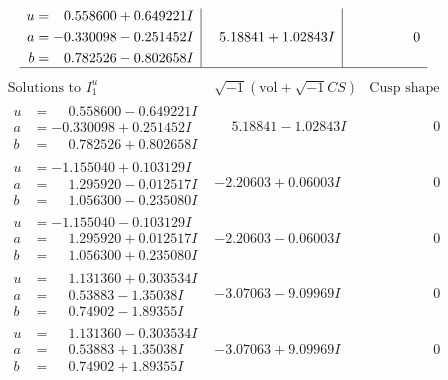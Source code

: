 \documentclass[1p]{elsarticle_modified}
\theoremstyle{definition}
\newcommand{\I}{\sqrt{-1}}
\begin{document}
$$\begin{array}{c|c|c}
\begin{aligned}
u &= \phantom{-}0.558600 + 0.649221 I \\
a &= -0.330098 - 0.251452 I \\
b &= \phantom{-}0.782526 - 0.802658 I\end{aligned}
 & \phantom{-}5.18841 + 1.02843 I & \phantom{-0.000000 } 0\\
 \hline 
 \end{array}$$\newpage$$\begin{array}{c|c|c}  
\text{Solutions to }I^u_{1}& \I (\text{vol} + \sqrt{-1}CS) & \text{Cusp shape}\\
 \hline 
\begin{aligned}
u &= \phantom{-}0.558600 - 0.649221 I \\
a &= -0.330098 + 0.251452 I \\
b &= \phantom{-}0.782526 + 0.802658 I\end{aligned}
 & \phantom{-}5.18841 - 1.02843 I & \phantom{-0.000000 } 0 \\ \hline\begin{aligned}
u &= -1.155040 + 0.103129 I \\
a &= \phantom{-}1.295920 - 0.012517 I \\
b &= \phantom{-}1.056300 - 0.235080 I\end{aligned}
 & -2.20603 + 0.06003 I & \phantom{-0.000000 } 0 \\ \hline\begin{aligned}
u &= -1.155040 - 0.103129 I \\
a &= \phantom{-}1.295920 + 0.012517 I \\
b &= \phantom{-}1.056300 + 0.235080 I\end{aligned}
 & -2.20603 - 0.06003 I & \phantom{-0.000000 } 0 \\ \hline\begin{aligned}
u &= \phantom{-}1.131360 + 0.303534 I \\
a &= \phantom{-}0.53883 - 1.35038 I \\
b &= \phantom{-}0.74902 - 1.89355 I\end{aligned}
 & -3.07063 - 9.09969 I & \phantom{-0.000000 } 0 \\ \hline\begin{aligned}
u &= \phantom{-}1.131360 - 0.303534 I \\
a &= \phantom{-}0.53883 + 1.35038 I \\
b &= \phantom{-}0.74902 + 1.89355 I\end{aligned}
 & -3.07063 + 9.09969 I & \phantom{-0.000000 } 0 \\ \hline\begin{aligned}

\end{aligned}
\end{array}$$
\end{document}
